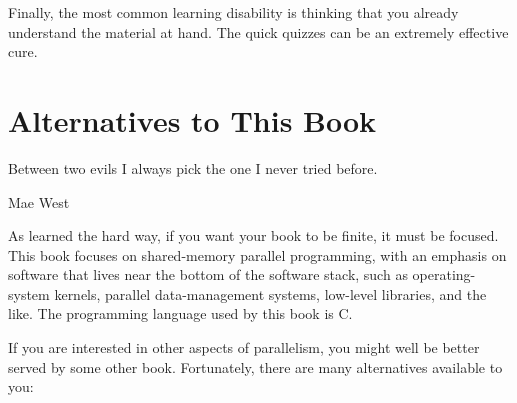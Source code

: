 Finally, the most common learning disability is thinking that
you already understand the material at hand.
The quick quizzes can be an extremely effective cure.

\section{Alternatives to This Book}
\label{sec:Alternatives to This Book}
%
\epigraph{Between two evils I always pick the one I never tried before.}
	 {Mae West}

As  learned the hard way, if you want your book
to be finite, it must be focused.
This book focuses on shared-memory parallel programming, with an
emphasis on software that lives near the bottom of the software stack,
such as operating-system kernels, parallel data-management systems,
low-level libraries, and the like.
The programming language used by this book is C.

If you are interested in other aspects of parallelism, you might well
be better served by some other book.
Fortunately, there are many alternatives available to you:

